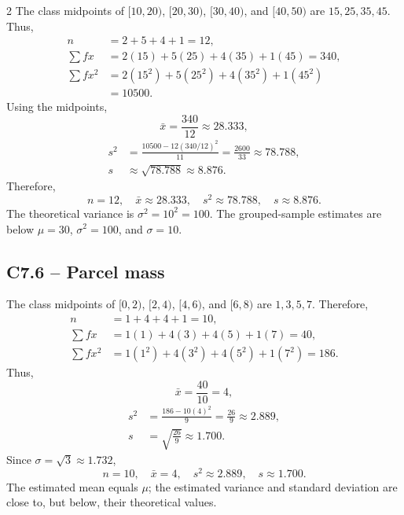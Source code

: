 \begin{multicols}{2}
		The class midpoints of
		$[10,20)$, $[20,30)$, $[30,40)$, and $[40,50)$ are
		$15,25,35,45$. Thus,
		\[
		\begin{aligned}
			n&=2+5+4+1=12,\\
			\sum fx&=2(15)+5(25)+4(35)+1(45)=340,\\
			\sum fx^2&=2(15^2)+5(25^2)+4(35^2)+1(45^2)\\
			&=10500.
		\end{aligned}
		\]
		Using the midpoints,
		\[
		\bar{x}=\frac{340}{12}\approx28.333,
		\]
		\[
		\begin{aligned}
			s^2&=\frac{10500-12(340/12)^2}{11}
			=\frac{2600}{33}\approx78.788,\\
			s&\approx\sqrt{78.788}\approx8.876.
		\end{aligned}
		\]
		Therefore,
		\[
		\boxed{n=12,\quad\bar{x}\approx28.333,\quad s^2\approx78.788,
			\quad s\approx8.876.}
		\]
		The theoretical variance is $\sigma^2=10^2=100$. The grouped-sample
		estimates are below $\mu=30$, $\sigma^2=100$, and $\sigma=10$.
		
		
		\subsection*{C7.6 -- Parcel mass}
		\label{subsec:c7-solution-parcels}
		
		The class midpoints of
		$[0,2)$, $[2,4)$, $[4,6)$, and $[6,8)$ are
		$1,3,5,7$. Therefore,
		\[
		\begin{aligned}
			n&=1+4+4+1=10,\\
			\sum fx&=1(1)+4(3)+4(5)+1(7)=40,\\
			\sum fx^2&=1(1^2)+4(3^2)+4(5^2)+1(7^2)=186.
		\end{aligned}
		\]
		Thus,
		\[
		\bar{x}=\frac{40}{10}=4,
		\]
		\[
		\begin{aligned}
			s^2&=\frac{186-10(4)^2}{9}=\frac{26}{9}\approx2.889,\\
			s&=\sqrt{\frac{26}{9}}\approx1.700.
		\end{aligned}
		\]
		Since $\sigma=\sqrt3\approx1.732$,
		\[
		\boxed{n=10,\quad\bar{x}=4,\quad s^2\approx2.889,
			\quad s\approx1.700.}
		\]
		The estimated mean equals $\mu$; the estimated variance and standard
		deviation are close to, but below, their theoretical values.
		
		

\end{multicols}
